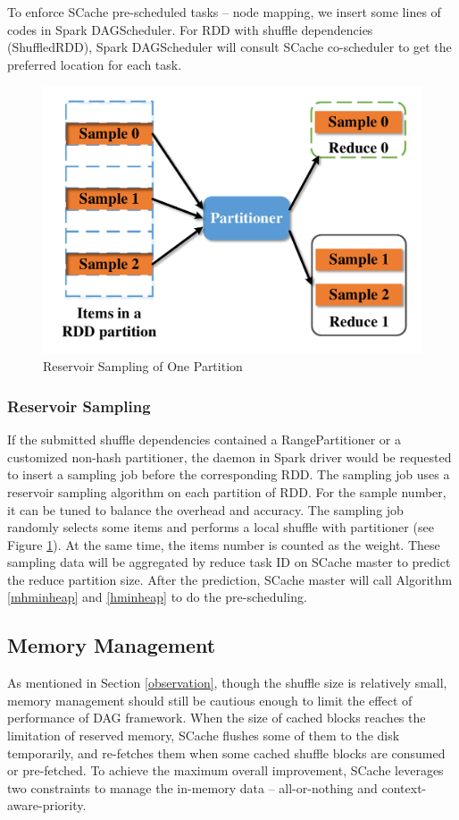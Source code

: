 To enforce SCache pre-scheduled tasks -- node mapping, we insert some lines of codes in Spark DAGScheduler.
For RDD with shuffle dependencies (ShuffledRDD), Spark DAGScheduler will consult SCache co-scheduler to get the preferred location for each task.

\begin{figure}
	\centering
	\includegraphics[width=0.6\linewidth]{fig/sample}
	\caption{Reservoir Sampling of One Partition}
	\label{fig:sample}
	\vspace{-1em}
\end{figure}

\subsubsection{Reservoir Sampling}\label{sampling}
If the submitted shuffle dependencies contained a RangePartitioner or a customized non-hash partitioner, the daemon in Spark driver would be requested to insert a sampling job before the corresponding RDD. 
The sampling job uses a reservoir sampling algorithm \cite{reservoir} on each partition of RDD. 
For the sample number, it can be tuned to balance the overhead and accuracy. 
The sampling job randomly selects some items and performs a local shuffle with partitioner (see Figure \ref{fig:sample}). 
At the same time, the items number is counted as the weight. 
These sampling data will be aggregated by reduce task ID on SCache master to predict the reduce partition size. 
After the prediction, SCache master will call Algorithm \ref{mhminheap} and \ref{hminheap} to do the pre-scheduling.

\subsection{Memory Management}\label{memorymanage}
As mentioned in Section \ref{observation}, though the shuffle size is relatively small, memory management should still be cautious enough to limit the effect of performance of DAG framework.
When the size of cached blocks reaches the limitation of reserved memory, SCache flushes some of them to the disk temporarily, and re-fetches them when some cached shuffle blocks are consumed or pre-fetched. 
To achieve the maximum overall improvement, SCache leverages two constraints to manage the in-memory data -- all-or-nothing and context-aware-priority.


